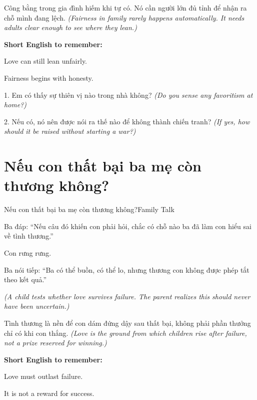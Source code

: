 \begin{baihoc}
Công bằng trong gia đình hiếm khi tự có. Nó cần người lớn đủ tỉnh để nhận ra chỗ mình đang lệch.
\textit{(Fairness in family rarely happens automatically. It needs adults clear enough to see where they lean.)}
\end{baihoc}

\begin{ghinhoanh}
\textbf{Short English to remember:}

Love can still lean unfairly.

Fairness begins with honesty.
\end{ghinhoanh}

\begin{tuhocnhanh}
1. Em có thấy sự thiên vị nào trong nhà không? \textit{(Do you sense any favoritism at home?)}

2. Nếu có, nó nên được nói ra thế nào để không thành chiến tranh? \textit{(If yes, how should it be raised without starting a war?)}
\end{tuhocnhanh}
\ngancach

\section{Nếu con thất bại ba mẹ còn thương không?}
\begin{truyen}{Nếu con thất bại ba mẹ còn thương không?}{Family Talk}

Ba đáp: ``Nếu câu đó khiến con phải hỏi, chắc có chỗ nào ba đã làm con hiểu sai về tình thương.''

Con rưng rưng.

Ba nói tiếp: ``Ba có thể buồn, có thể lo, nhưng thương con không được phép tắt theo kết quả.''

\textit{(A child tests whether love survives failure. The parent realizes this should never have been uncertain.)}
\end{truyen}

\begin{baihoc}
Tình thương là nền để con dám đứng dậy sau thất bại, không phải phần thưởng chỉ có khi con thắng.
\textit{(Love is the ground from which children rise after failure, not a prize reserved for winning.)}
\end{baihoc}

\begin{ghinhoanh}
\textbf{Short English to remember:}

Love must outlast failure.

It is not a reward for success.
\end{ghinhoanh}

